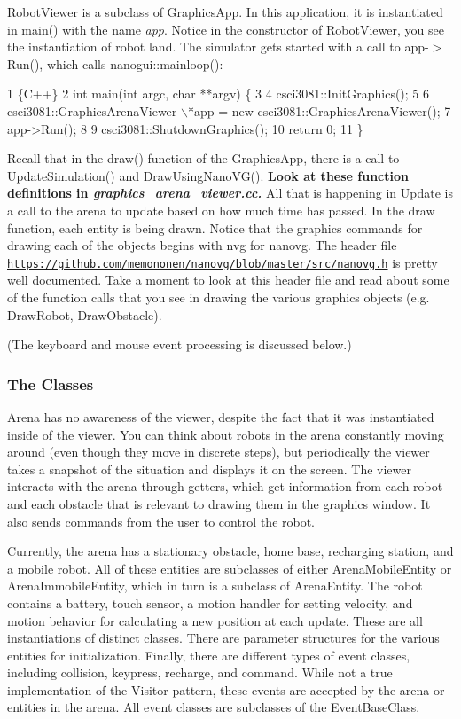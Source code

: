 Robot\+Viewer is a subclass of Graphics\+App. In this application, it is instantiated in main() with the name {\itshape app}. Notice in the constructor of Robot\+Viewer, you see the instantiation of robot land. The simulator gets started with a call to app-\/$>$Run(), which calls nanogui\+::mainloop()\+:


\begin{DoxyCode}
1 \{C++\}
2 int main(int argc, char **argv) \{
3 
4   csci3081::InitGraphics();
5 
6   csci3081::GraphicsArenaViewer \(\backslash\)*app = new csci3081::GraphicsArenaViewer();
7   app->Run();
8 
9   csci3081::ShutdownGraphics();
10   return 0;
11 \}
\end{DoxyCode}


Recall that in the draw() function of the Graphics\+App, there is a call to Update\+Simulation() and Draw\+Using\+Nano\+V\+G(). {\bfseries Look at these function definitions in {\itshape graphics\+\_\+arena\+\_\+viewer.\+cc.}} All that is happening in Update is a call to the arena to update based on how much time has passed. In the draw function, each entity is being drawn. Notice that the graphics commands for drawing each of the objects begins with {\ttfamily nvg} for nanovg. The header file {\ttfamily \href{https://github.com/memononen/nanovg/blob/master/src/nanovg.h}{\tt https\+://github.\+com/memononen/nanovg/blob/master/src/nanovg.\+h}} is pretty well documented. Take a moment to look at this header file and read about some of the function calls that you see in drawing the various graphics objects (e.\+g. Draw\+Robot, Draw\+Obstacle).

(The keyboard and mouse event processing is discussed below.)

\subsubsection*{The Classes}

Arena has no awareness of the viewer, despite the fact that it was instantiated inside of the viewer. You can think about robots in the arena constantly moving around (even though they move in discrete steps), but periodically the viewer takes a snapshot of the situation and displays it on the screen. The viewer interacts with the arena through getters, which get information from each robot and each obstacle that is relevant to drawing them in the graphics window. It also sends commands from the user to control the robot.

Currently, the arena has a stationary obstacle, home base, recharging station, and a mobile robot. All of these entities are subclasses of either Arena\+Mobile\+Entity or Arena\+Immobile\+Entity, which in turn is a subclass of Arena\+Entity. The robot contains a battery, touch sensor, a motion handler for setting velocity, and motion behavior for calculating a new position at each update. These are all instantiations of distinct classes. There are parameter structures for the various entities for initialization. Finally, there are different types of event classes, including collision, keypress, recharge, and command. While not a true implementation of the Visitor pattern, these events are accepted by the arena or entities in the arena. All event classes are subclasses of the Event\+Base\+Class.

